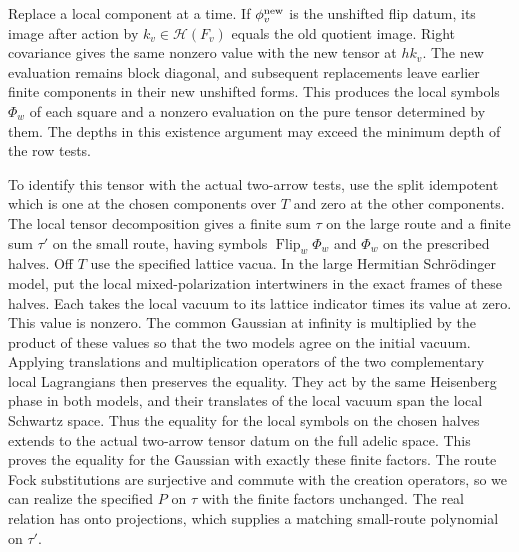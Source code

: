 Replace a local component at a time. If \(\phi_v^{\rm new}\)
is the unshifted flip datum, its image after action by
\(k_v\in\mathcal H(F_v)\) equals the old quotient image.
Right covariance gives the same nonzero value with the
new tensor at \(h k_v\). The new evaluation remains block
diagonal, and subsequent replacements leave earlier
finite components in their new unshifted forms. This
produces the local symbols \(\Phi_w\) of each square and a
nonzero evaluation on the pure tensor determined by them.
The depths in this existence argument may exceed the
minimum depth of the row tests.

To identify this tensor with the actual two-arrow tests,
use the split idempotent which is one at the chosen
components over \(T\) and zero at the other components.
The local tensor decomposition gives a finite sum
\(\tau\) on the large route and a finite sum \(\tau'\) on the
small route, having symbols \(\operatorname{Flip}_w\Phi_w\)
and \(\Phi_w\) on the prescribed halves. Off \(T\) use the
specified lattice vacua. In the large Hermitian
Schr\"odinger model, put the local mixed-polarization
intertwiners in the exact frames of these halves. Each
takes the local vacuum to its lattice indicator times its
value at zero. This value is nonzero. The common Gaussian
at infinity is multiplied by the product of these values
so that the two models agree on the initial vacuum.
Applying translations and multiplication operators of
the two complementary local Lagrangians then preserves
the equality. They act by the same Heisenberg phase in
both models, and their translates of the local vacuum
span the local Schwartz space. Thus the equality for
the local symbols on the chosen halves extends to the
actual two-arrow tensor datum on the full adelic space.
This proves the equality for the Gaussian with exactly
these finite factors. The route Fock substitutions are
surjective and commute with the creation operators,
so we can realize the specified \(P\) on \(\tau\) with
the finite factors unchanged. The real relation has
onto projections, which supplies a matching small-route
polynomial on \(\tau'\).

